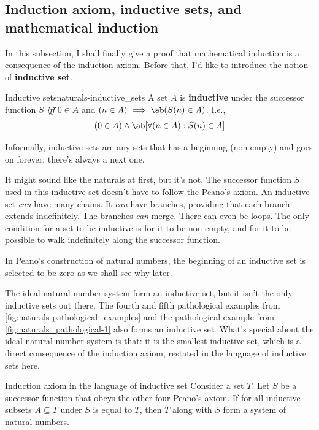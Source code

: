 \subsection{Induction axiom, inductive sets, and mathematical induction}

In this subsection, I shall finally give a proof that mathematical induction is a consequence of the
induction axiom. Before that, I'd like to introduce the notion of \textbf{inductive set}.

\begin{df}{Inductive sets}{naturals-inductive_sets}
  A set \(A\) is \textbf{inductive} under the successor function \(S\) \emph{iff} \(0 \in A\) and
  \((n \in A) \implies \ab(S(n) \in A)\). I.e.,
  \begin{equation*}
    (0 \in A) \land \ab[\forall(n \in A) : S(n) \in A]
  \end{equation*}
\end{df}

Informally, inductive sets are any sets that has a beginning (non-empty) and goes on forever;
there's always a next one.

It might sound like the naturals at first, but it's not. The successor function \(S\) used in
this inductive set doesn't have to follow the Peano's axiom. An inductive set
\emph{can} have many chains. It \emph{can} have branches, providing that each branch
extends indefinitely. The branches \emph{can} merge. There can even be loops. The
only condition for a set to be inductive is for it to be non-empty, and for it to be
possible to walk indefinitely along the successor function.

In Peano's construction of natural numbers, the beginning of an inductive set is selected
to be zero as we shall see why later.

The ideal natural number system form an inductive set, but it isn't the only inductive sets out
there. The fourth and fifth pathological examples from
\cref{fig:naturals-pathological_examples} and the pathological example from
\cref{fig:naturals_pathological-1} also forms an inductive set. What's special about
the ideal natural number system is that: it is the smallest inductive set, which is a direct
consequence of the induction axiom, restated in the language of inductive sets here.

\begin{cor}{Induction axiom in the language of inductive set}{}
  Consider a set \(T\). Let \(S\) be a successor function that obeys the other four
  Peano's axiom. If for all inductive subsets \(A \subseteq T\) under \(S\) is equal
  to \(T\), then \(T\) along with \(S\) form a system of natural numbers.
\end{cor}

